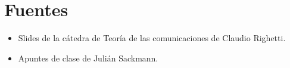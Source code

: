 \documentclass[]{article}
\begin{document}
\newpage
\section{Fuentes}
\begin{itemize}
    \item Slides de la cátedra de Teoría de las comunicaciones de Claudio Righetti.
    \item Apuntes de clase de Julián Sackmann.
\end{itemize}


\end{document}
